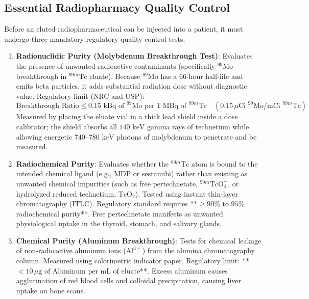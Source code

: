 \documentclass[11pt,a4paper]{article}
\begin{document}
\subsection{Essential Radiopharmacy Quality Control}
Before an eluted radiopharmaceutical can be injected into a patient, it must undergo three mandatory regulatory quality control tests:
\begin{enumerate}[leftmargin=*]
    \item \textbf{Radionuclidic Purity (Molybdenum Breakthrough Test)}: Evaluates the presence of unwanted radioactive contaminants (specifically $^{99}\text{Mo}$ breakthrough in $^{99m}\text{Tc}$ eluate). Because $^{99}\text{Mo}$ has a $66\text{-hour}$ half-life and emits beta particles, it adds substantial radiation dose without diagnostic value. Regulatory limit (NRC and USP):
    \begin{equation}
        \text{Breakthrough Ratio} \le 0.15\text{ kBq of }^{99}\text{Mo per } 1\text{ MBq of }^{99m}\text{Tc} \quad (0.15\,\mu\text{Ci } ^{99}\text{Mo}/\text{mCi } ^{99m}\text{Tc})
    \end{equation}
    Measured by placing the eluate vial in a thick lead shield inside a dose calibrator; the shield absorbs all $140\text{ keV}$ gamma rays of technetium while allowing energetic $740\text{--}780\text{ keV}$ photons of molybdenum to penetrate and be measured.
    \item \textbf{Radiochemical Purity}: Evaluates whether the $^{99m}\text{Tc}$ atom is bound to the intended chemical ligand (e.g., MDP or sestamibi) rather than existing as unwanted chemical impurities (such as free pertechnetate, $^{99m}\text{TcO}_4^-$, or hydrolyzed reduced technetium, $\text{TcO}_2$). Tested using instant thin-layer chromatography (ITLC). Regulatory standard requires **$\ge 90\%\text{ to }95\%$ radiochemical purity**. Free pertechnetate manifests as unwanted physiological uptake in the thyroid, stomach, and salivary glands.
    \item \textbf{Chemical Purity (Aluminum Breakthrough)}: Tests for chemical leakage of non-radioactive aluminum ions ($\text{Al}^{3+}$) from the alumina chromatography column. Measured using colorimetric indicator paper. Regulatory limit: **$<10\,\mu\text{g of Aluminum per mL of eluate}$**. Excess aluminum causes agglutination of red blood cells and colloidal precipitation, causing liver uptake on bone scans.
\end{enumerate}
\end{document}
